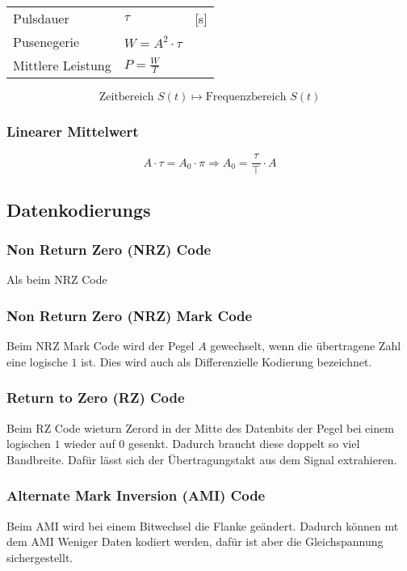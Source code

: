 \begin{multicols}{2}
	\begin{tabular}{l l l}
		Pulsdauer & $\tau$ & [s] \\
		Pusenegerie & $W=A^2 \cdot \tau$ & \\
		Mittlere Leistung & $P=\frac{W}{T}$ &
	\end{tabular}
	\[
		\text{Zeitbereich } S(t) \mapsto \text{Frequenzbereich } S(t)
	\]


\subsubsection{Linearer Mittelwert}

	\[
		A \cdot \tau = A_0 \cdot \pi \Rightarrow A_0 =\frac{\tau}{\top} \cdot A
	\]

\subsection{Datenkodierungs}

\subsubsection{Non Return Zero (NRZ) Code}
	Als beim NRZ Code

\subsubsection{Non Return Zero (NRZ) Mark Code}
	Beim NRZ Mark Code wird der Pegel $A$ gewechselt, wenn die übertragene Zahl eine logische $1$ ist. Dies wird auch als Differenzielle Kodierung bezeichnet.

\subsubsection{Return to Zero (RZ) Code}
	Beim RZ Code wieturn Zerord in der Mitte des Datenbits der Pegel bei einem logischen $1$ wieder auf $0$ gesenkt. Dadurch braucht diese doppelt so viel Bandbreite.
	Dafür lässt sich der Übertragungstakt aus dem Signal extrahieren.

\subsubsection{Alternate Mark Inversion (AMI) Code}
	Beim AMI wird bei einem Bitwechsel die Flanke geändert. Dadurch können mt dem AMI Weniger Daten kodiert werden, dafür ist aber die Gleichspannung sichergestellt.



\end{multicols}
